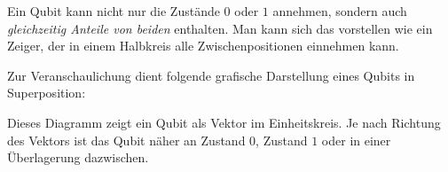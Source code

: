 Ein Qubit kann nicht nur die Zustände \(0\) oder \(1\) annehmen, sondern auch \emph{gleichzeitig Anteile von beiden} enthalten. Man kann sich das vorstellen wie ein Zeiger, der in einem Halbkreis alle Zwischenpositionen einnehmen kann. 

\bigskip

\noindent
Zur Veranschaulichung dient folgende grafische Darstellung eines Qubits in Superposition:


\begin{center}
\end{center}

\bigskip

Dieses Diagramm zeigt ein Qubit als Vektor im Einheitskreis. Je nach Richtung des Vektors ist das Qubit näher an Zustand \(0\), Zustand \(1\) oder in einer Überlagerung dazwischen.

